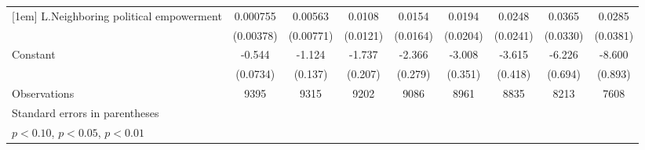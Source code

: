\begin{table}[htbp]
\begin{tabular}{l*{8}{c}}
[1em]
L.Neighboring political empowerment&    0.000755         &     0.00563         &      0.0108         &      0.0154         &      0.0194         &      0.0248         &      0.0365         &      0.0285         \\
                    &   (0.00378)         &   (0.00771)         &    (0.0121)         &    (0.0164)         &    (0.0204)         &    (0.0241)         &    (0.0330)         &    (0.0381)         \\
[1em]
Constant            &      -0.544\sym{***}&      -1.124\sym{***}&      -1.737\sym{***}&      -2.366\sym{***}&      -3.008\sym{***}&      -3.615\sym{***}&      -6.226\sym{***}&      -8.600\sym{***}\\
                    &    (0.0734)         &     (0.137)         &     (0.207)         &     (0.279)         &     (0.351)         &     (0.418)         &     (0.694)         &     (0.893)         \\
\hline
Observations        &        9395         &        9315         &        9202         &        9086         &        8961         &        8835         &        8213         &        7608         \\
\hline\hline
\multicolumn{9}{l}{\footnotesize Standard errors in parentheses}\\
\multicolumn{9}{l}{\footnotesize \sym{*} \(p<0.10\), \sym{**} \(p<0.05\), \sym{***} \(p<0.01\)}\\
\end{tabular}
\end{table}
